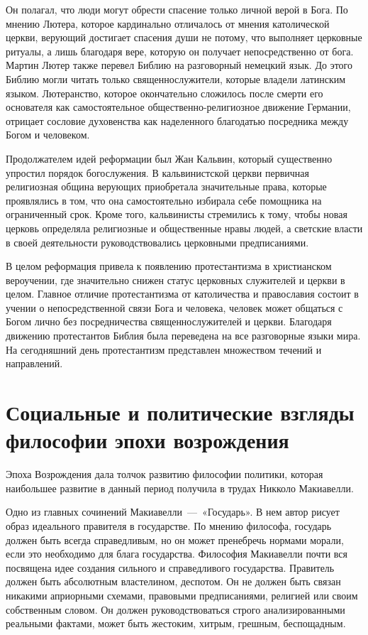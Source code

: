 \documentclass[14pt]{extarticle}
\begin{document}
Он полагал, что люди могут обрести спасение только личной верой в Бога. По мнению Лютера, которое кардинально отличалось от мнения католической церкви, верующий дос­тигает спасения души не потому, что выполняет церковные ритуалы, а лишь благодаря вере, которую он получает непосредственно от бога. Мартин Лютер также перевел Библию на разговорный немецкий язык. До этого Библию могли читать только священнослужители, которые владели латинским языком. Лютеранство, которое окончательно сложилось после смерти его основателя как самостоятельное общественно-религиозное дви­жение Германии, отрицает сословие духовенства как наделенного бла­годатью посредника между Богом и человеком.

Продолжателем идей реформации был Жан Кальвин, который существенно упростил порядок богослужения. В кальви­нистской церкви первичная религиозная община верующих приобретала значительные права, которые проявлялись в том, что она само­стоятельно избирала себе помощника на ограниченный срок. Кроме того, кальвинисты стремились к тому, чтобы новая церковь определя­ла религиозные и общественные нравы людей, а светские власти в своей деятельности руководствовались церковными предписаниями.

В целом реформация привела к появлению протестантизма в христианском вероучении, где значительно снижен статус церковных служителей и церкви в целом. Главное отличие протестантизма от католичества и православия состоит в учении о непосредственной связи Бога и человека, человек может общаться с Богом лично без посредничества священнослужителей и церкви. Благодаря движению протестантов Библия была переведена на все разговорные языки мира. На сегодняшний день протестантизм представлен множеством течений и направлений.


\section{Социальные и политические взгляды философии эпохи возрождения}

Эпоха Возрождения дала толчок развитию философии политики, которая наибольшее развитие в данный период получила в трудах Никколо Макиавелли.

Одно из главных сочинений Макиавелли~---~«Государь». В нем автор рисует образ идеального правителя в государстве. По мнению философа, государь должен быть всегда справедливым, но он может пренебречь нормами морали, если это необходимо для блага государства. Философия Макиавелли почти вся посвящена идее создания сильного и справедливого государства. Правитель должен быть абсолютным властелином, деспотом. Он не дол­жен быть связан никакими априорными схемами, пра­вовыми предписаниями, религией или своим собствен­ным словом. Он должен руководствоваться строго анализированными реальными фактами, может быть жестоким, хитрым, грешным, беспощадным. 
\end{document}

